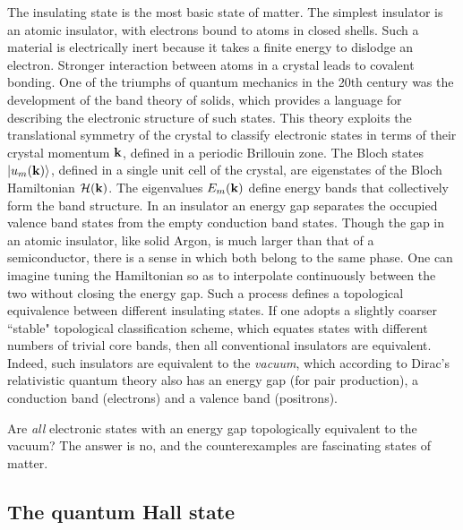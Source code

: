 \documentclass[twocolumn,floatfix,showpacs,rmp,aps]{revtex4}
\begin{document}
	The insulating state is the most basic state of matter.  The simplest insulator is
	an atomic insulator, with electrons bound to atoms in closed shells.
	Such a material is electrically inert because it takes a finite energy to
	dislodge an electron.  Stronger interaction between atoms in a crystal
	leads to covalent bonding.  One of the triumphs of quantum
	mechanics in the 20th century was the development of the band theory of solids,
	which provides a language for describing the electronic structure of such
	states.  This theory exploits the translational symmetry of the
	crystal to classify electronic states in terms of their crystal momentum
	${\bf k}$, defined in a periodic Brillouin zone.  The Bloch states
	$|u_m({\bf k})\rangle$, defined in a single unit cell of the crystal,
	are eigenstates of the Bloch Hamiltonian ${\cal H}({\bf k})$.
	The eigenvalues $E_m({\bf k})$
	define energy bands that collectively form the band structure.
	In an insulator an energy
	gap separates the occupied valence band states from the empty
	conduction band states.  Though the gap in an atomic
	insulator, like solid Argon, is much larger than that of a
	semiconductor, there is a sense in
	which both belong to the same phase.  One can imagine
	tuning the Hamiltonian so as to interpolate continuously between the
	two without closing the energy gap.  Such a process defines a topological
	equivalence between different insulating states.
	If one adopts a slightly coarser
	``stable" topological classification scheme, which
	equates states with different numbers of trivial core bands,
	then all conventional
	insulators are equivalent.  Indeed, such insulators are
	equivalent to the {\it vacuum}, which according to Dirac's
	relativistic quantum theory also has an energy gap (for pair production),
	a conduction band (electrons) and a valence band (positrons).
	
	Are {\it all} electronic states with an
	energy gap topologically equivalent to the vacuum?  The answer
	is no, and the counterexamples are fascinating
	states of matter.
	
	
	\subsection{The quantum Hall state}
	\label{sec:qhall}
	
\end{document}
